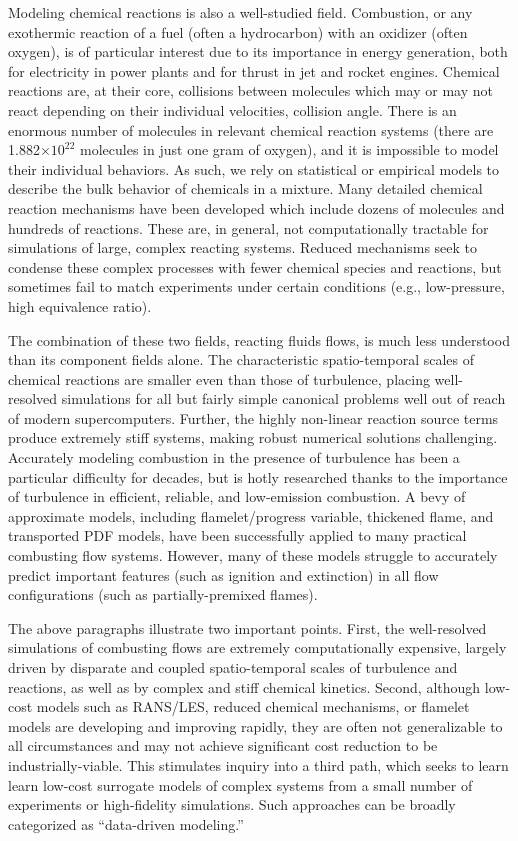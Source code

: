 Modeling chemical reactions is also a well-studied field. Combustion, or any exothermic reaction of a fuel (often a hydrocarbon) with an oxidizer (often oxygen), is of particular interest due to its importance in energy generation, both for electricity in power plants and for thrust in jet and rocket engines. Chemical reactions are, at their core, collisions between molecules which may or may not react depending on their individual velocities, collision angle. There is an enormous number of molecules in relevant chemical reaction systems (there are 1.882$\times 10^{22}$ molecules in just one gram of oxygen), and it is impossible to model their individual behaviors. As such, we rely on statistical or empirical models to describe the bulk behavior of chemicals in a mixture. Many detailed chemical reaction mechanisms have been developed which include dozens of molecules and hundreds of reactions. These are, in general, not computationally tractable for simulations of large, complex reacting systems. Reduced mechanisms seek to condense these complex processes with fewer chemical species and reactions, but sometimes fail to match experiments under certain conditions (e.g., low-pressure, high equivalence ratio).

The combination of these two fields, reacting fluids flows, is much less understood than its component fields alone. The characteristic spatio-temporal scales of chemical reactions are smaller even than those of turbulence, placing well-resolved simulations for all but fairly simple canonical problems well out of reach of modern supercomputers. Further, the highly non-linear reaction source terms produce extremely stiff systems, making robust numerical solutions challenging. Accurately modeling combustion in the presence of turbulence has been a particular difficulty for decades, but is hotly researched thanks to the importance of turbulence in efficient, reliable, and low-emission combustion. A bevy of approximate models, including flamelet/progress variable, thickened flame, and transported PDF models, have been successfully applied to many practical combusting flow systems. However, many of these models struggle to accurately predict important features (such as ignition and extinction) in all flow configurations (such as partially-premixed flames). 

The above paragraphs illustrate two important points. First, the well-resolved simulations of combusting flows are extremely computationally expensive, largely driven by disparate and coupled spatio-temporal scales of turbulence and reactions, as well as by complex and stiff chemical kinetics. Second, although low-cost models such as RANS/LES, reduced chemical mechanisms, or flamelet models are developing and improving rapidly, they are often not generalizable to all circumstances and may not achieve significant cost reduction to be industrially-viable. This stimulates inquiry into a third path, which seeks to learn learn low-cost surrogate models of complex systems from a small number of experiments or high-fidelity simulations. Such approaches can be broadly categorized as ``data-driven  modeling.'' 
